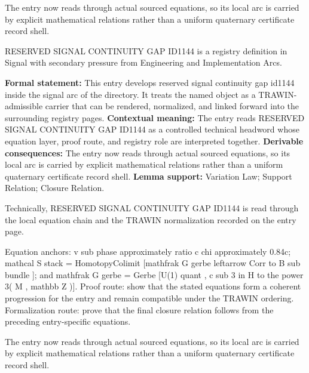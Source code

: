 The entry now reads through actual sourced equations, so its local arc is carried by explicit mathematical relations rather than a uniform quaternary certificate record shell.
\clearpage


\begingroup\small
{}
RESERVED SIGNAL CONTINUITY GAP ID1144 is a registry definition in Signal with secondary pressure from Engineering and Implementation Arcs.

\begingroup\footnotesize\setlength{\emergencystretch}{3em}\sloppy
\textbf{Formal statement:} This entry develops reserved signal continuity gap id1144 inside the signal arc of the directory. It treats the named object as a TRAWIN-admissible carrier that can be rendered, normalized, and linked forward into the surrounding registry pages. \textbf{Contextual meaning:} The entry reads RESERVED SIGNAL CONTINUITY GAP ID1144 as a controlled technical headword whose equation layer, proof route, and registry role are interpreted together. \textbf{Derivable consequences:} The entry now reads through actual sourced equations, so its local arc is carried by explicit mathematical relations rather than a uniform quaternary certificate record shell. \textbf{Lemma support:} Variation Law; Support Relation; Closure Relation.\par
\endgroup

Technically, RESERVED SIGNAL CONTINUITY GAP ID1144 is read through the local equation chain and the TRAWIN normalization recorded on the entry page.

Equation anchors: v sub phase approximately ratio c chi approximately 0.84c; mathcal S stack = HomotopyColimit [mathfrak G gerbe leftarrow Corr to B sub bundle ]; and mathfrak G gerbe = Gerbe [U(1) quant , c sub 3 in H to the power 3( M , mathbb Z )]. Proof route: show that the stated equations form a coherent progression for the entry and remain compatible under the TRAWIN ordering. Formalization route: prove that the final closure relation follows from the preceding entry-specific equations.

The entry now reads through actual sourced equations, so its local arc is carried by explicit mathematical relations rather than a uniform quaternary certificate record shell.
\endgroup


